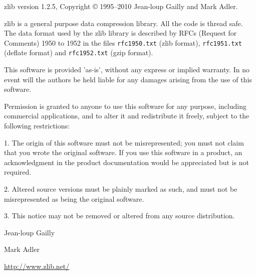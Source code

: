 \noindent
zlib version 1.2.5, Copyright {\copyright} 1995--2010 Jean-loup Gailly
and Mark Adler.


zlib is a general purpose data compression library. All the code is
thread safe. The data format used by the zlib library is described by
RFCs (Request for Comments) 1950 to 1952 in the files
\verb|rfc1950.txt| (zlib format), \verb|rfc1951.txt| (deflate format)
and \verb|rfc1952.txt| (gzip format).


This software is provided 'as-is', without any express or implied
warranty. In no event will the authors be held liable for any damages
arising from the use of this software.

Permission is granted to anyone to use this software for any purpose,
including commercial applications, and to alter it and redistribute it
freely, subject to the following restrictions:

1. The origin of this software must not be misrepresented; you must not
   claim that you wrote the original software. If you use this software
   in a product, an acknowledgment in the product documentation would
   be appreciated but is not required.

2. Altered source versions must be plainly marked as such, and must not
   be misrepresented as being the original software.

3. This notice may not be removed or altered from any source
   distribution.

\hfill Jean-loup Gailly

\hfill Mark Adler


\noindent
\url{http://www.zlib.net/}

